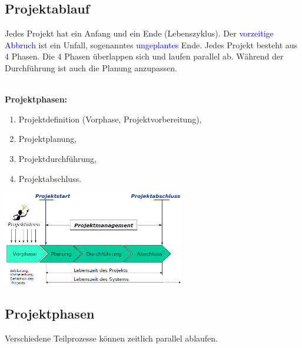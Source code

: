 \subsection{Projektablauf}
Jedes Projekt hat ein Anfang und ein Ende (Lebenszyklus). Der \textcolor{blue}{vorzeitige Abbruch} ist ein Unfall, sogenanntes \newline \textcolor{blue}{ungeplantes} Ende. Jedes Projekt besteht aus 4 Phasen. Die 4 Phasen überlappen sich und laufen parallel ab. \newline Während der Durchführung ist auch die Planung anzupassen. \\
\\
\begin{minipage}{6cm}
	\textbf{Projektphasen:}
	\begin{enumerate}
		\item Projektdefinition (Vorphase, Projektvorbereitung),
		\item Projektplanung,
		\item Projektdurchführung,
		\item Projektabschluss.
	\end{enumerate}
\end{minipage}
\begin{minipage}{7cm}
	\includegraphics[width=8cm]{images/projektablauf.png}
\end{minipage}

\subsection{Projektphasen}
Verschiedene Teilprozesse können zeitlich parallel ablaufen. 
